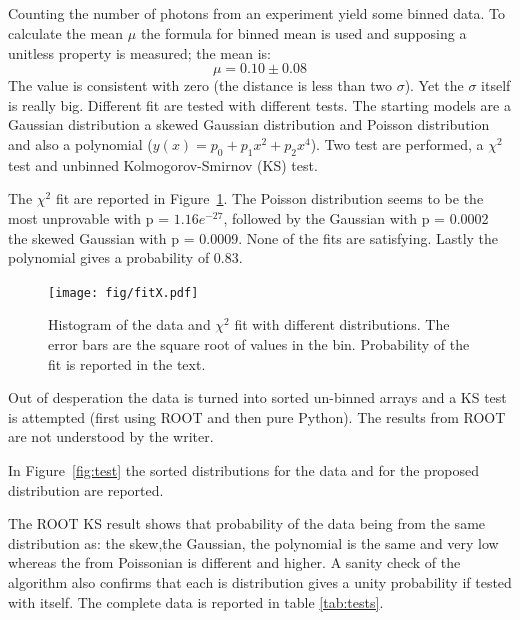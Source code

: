 \documentclass[twocolumn]{article}
\begin{document}
	\subsection{}
	\label{subs:photon}
		Counting the number of photons from an experiment yield some binned data.
		To calculate the mean $\mu$ the formula for binned mean is used and supposing  a unitless property is measured; the mean is:
		\begin{equation}
			 \mu = 0.10 \pm 0.08
		\end{equation}
		The value is consistent with zero (the distance is less than two  $\sigma$). Yet the $\sigma$ itself is really big.
		Different fit are tested with different tests. The starting models are a Gaussian distribution a skewed Gaussian distribution and Poisson distribution and also a polynomial ($y(x) =p_0 + p_1 x^2 + p_2x^4 $).
		Two test are performed, a $\chi ^2 $ test and  unbinned Kolmogorov-Smirnov (KS) test.

		The $\chi ^2 $ fit are reported in Figure~\ref{fig:fitX}. The Poisson distribution seems to be the most unprovable  with p = $1.16e^{-27}$, followed by the Gaussian with p = 0.0002 the skewed Gaussian with p = 0.0009. None of the fits are satisfying.
		Lastly the polynomial gives a probability of 0.83.
		\begin{figure}[h!]
			\begin{center}
				\texttt{[image: fig/fitX.pdf]}
			\end{center}
			\caption{Histogram of the data and $\chi ^2 $ fit with different distributions. The error bars are the square root of values in the bin. Probability of the fit is reported in the text.}
			\label{fig:fitX}
		\end{figure}

		Out of desperation the data is turned into sorted un-binned arrays and a KS test is attempted (first using ROOT and then pure Python).
		The results from ROOT are not understood by the writer.

		In Figure~\ref{fig:test} the sorted distributions for the data and for the proposed distribution are reported.

		The  ROOT KS result shows that probability of the data  being from the same distribution as: the skew,the Gaussian, the polynomial is the same and very low whereas the  from Poissonian is different and higher.
		A sanity check of the algorithm also confirms that each is distribution gives a unity probability if tested with itself.
		The complete data is reported in table \ref{tab:tests}.
\end{document}
